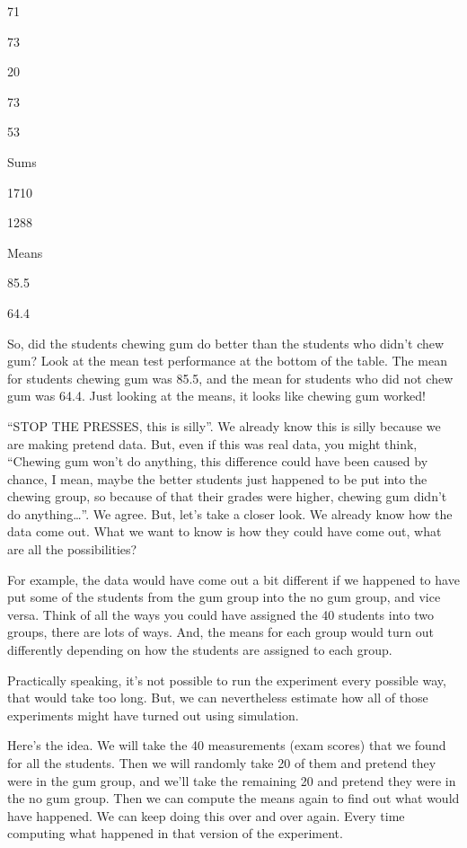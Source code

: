 \documentclass[
]{book}
\begin{document}
71

73

20

73

53

Sums

1710

1288

Means

85.5

64.4

So, did the students chewing gum do better than the students who didn't chew gum? Look at the mean test performance at the bottom of the table. The mean for students chewing gum was 85.5, and the mean for students who did not chew gum was 64.4. Just looking at the means, it looks like chewing gum worked!

``STOP THE PRESSES, this is silly''. We already know this is silly because we are making pretend data. But, even if this was real data, you might think, ``Chewing gum won't do anything, this difference could have been caused by chance, I mean, maybe the better students just happened to be put into the chewing group, so because of that their grades were higher, chewing gum didn't do anything\ldots{}''. We agree. But, let's take a closer look. We already know how the data come out. What we want to know is how they could have come out, what are all the possibilities?

For example, the data would have come out a bit different if we happened to have put some of the students from the gum group into the no gum group, and vice versa. Think of all the ways you could have assigned the 40 students into two groups, there are lots of ways. And, the means for each group would turn out differently depending on how the students are assigned to each group.

Practically speaking, it's not possible to run the experiment every possible way, that would take too long. But, we can nevertheless estimate how all of those experiments might have turned out using simulation.

Here's the idea. We will take the 40 measurements (exam scores) that we found for all the students. Then we will randomly take 20 of them and pretend they were in the gum group, and we'll take the remaining 20 and pretend they were in the no gum group. Then we can compute the means again to find out what would have happened. We can keep doing this over and over again. Every time computing what happened in that version of the experiment.
\end{document}
